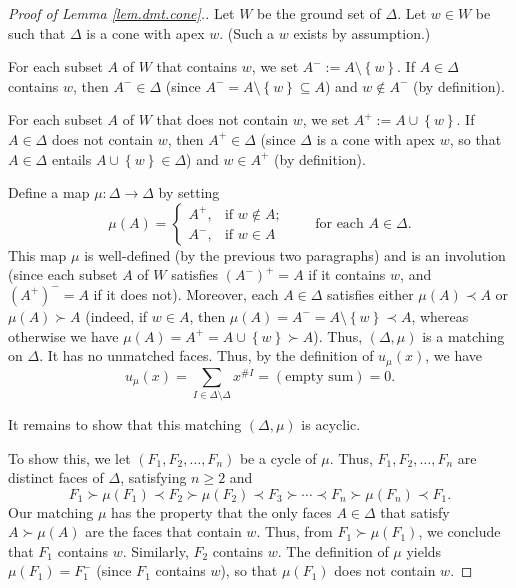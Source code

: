 \documentclass[12pt]{amsart}
\theoremstyle{definition}
\begin{document}
\begin{proof}[Proof of Lemma \ref{lem.dmt.cone}.]
Let $W$ be the ground set of $\Delta$. Let $w\in W$ be such that $\Delta$ is a
cone with apex $w$. (Such a $w$ exists by assumption.)

For each subset $A$ of $W$ that contains $w$, we set $A^-:=A\setminus
\left\{  w\right\}  $. If $A\in\Delta$ contains $w$, then $A^-\in\Delta$
(since $A^-=A\setminus\left\{  w\right\}  \subseteq A$) and $w\notin A^-$
(by definition).

For each subset $A$ of $W$ that does not contain $w$, we set $A^+%
:=A\cup\left\{  w\right\}  $. If $A\in\Delta$ does not contain $w$, then
$A^+\in\Delta$ (since $\Delta$ is a cone with apex $w$, so that $A\in\Delta$
entails $A\cup\left\{  w\right\}  \in\Delta$) and $w\in A^+$ (by definition).

Define a map $\mu:\Delta\rightarrow\Delta$ by setting%
\[
\mu\left(  A\right)  =%
\begin{cases}
A^+, & \text{if }w\notin A;\\
A^-, & \text{if }w\in A
\end{cases}
\qquad\text{for each }A\in\Delta.
\]
This map $\mu$ is well-defined (by the previous two paragraphs) and is an
involution (since each subset $A$ of $W$ satisfies $\left(  A^-\right)
^+=A$ if it contains $w$, and $\left(  A^+\right)  ^-=A$ if it does
not). Moreover, each $A\in\Delta$ satisfies either $\mu\left(  A\right)  \prec
A$ or $\mu\left(  A\right)  \succ A$ (indeed, if $w\in A$, then $\mu\left(
A\right)  =A^-=A\setminus\left\{  w\right\}  \prec A$, whereas otherwise we
have $\mu\left(  A\right)  =A^+=A\cup\left\{  w\right\}  \succ A$). Thus,
$\left(  \Delta,\mu\right)  $ is a matching on $\Delta$. It has no unmatched
faces. Thus, by the definition of $u_{\mu}\left(  x\right)  $, we have%
\[
u_{\mu}\left(  x\right)  =\sum_{I\in\Delta\setminus\Delta}x^{\#I}=\left(
\text{empty sum}\right)  =0.
\]


It remains to show that this matching $\left(  \Delta,\mu\right)  $ is acyclic.

To show this, we let $\left(  F_{1},F_{2},\ldots,F_{n}\right)  $ be a cycle of
$\mu$. Thus, $F_{1},F_{2},\ldots,F_{n}$ are distinct faces of $\Delta$,
satisfying $n\geq2$ and%
\[
F_{1}\succ\mu\left(  F_{1}\right)  \prec F_{2}\succ\mu\left(  F_{2}\right)
\prec F_{3}\succ\cdots\prec F_{n}\succ\mu\left(  F_{n}\right)  \prec F_{1}.
\]
Our matching $\mu$ has the property that the only faces $A\in\Delta$ that
satisfy $A\succ\mu\left(  A\right)  $ are the faces that contain $w$. Thus,
from $F_{1}\succ\mu\left(  F_{1}\right)  $, we conclude that $F_{1}$ contains
$w$. Similarly, $F_{2}$ contains $w$. The definition of $\mu$ yields
$\mu\left(  F_{1}\right)  =F_{1}^-$ (since $F_{1}$ contains $w$), so that
$\mu\left(  F_{1}\right)  $ does not contain $w$.


\end{proof}
\end{document}
